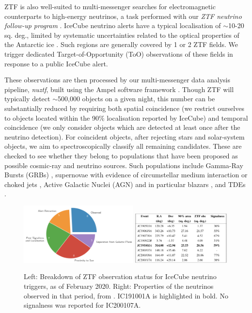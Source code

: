\documentclass[a4paper,11pt]{article}
\begin{document}
ZTF is also well-suited to multi-messenger searches for electromagnetic counterparts to high-energy neutrinos, a task performed with our \emph{ZTF neutrino follow-up program} \cite{bran}. IceCube neutrino alerts have a typical localisation of $\sim$10-20 sq. deg., limited by systematic uncertainties related to the optical properties of the Antarctic ice \cite{ic_resimulations_21}. Such regions are generally covered by 1 or 2 ZTF fields. We trigger dedicated Target-of-Opportunity (ToO) observations of these fields in response to a public IceCube alert. 

These observations are then processed by our multi-messenger data analysis pipeline, \emph{nuztf}, built using the Ampel software framework \cite{ampel, bran, nuztf}. Though ZTF will typically detect $\sim$500,000 objects on a given night, this number can be substantially reduced by requiring both spatial coincidence (we restrict ourselves to objects located within the 90\% localisation reported by IceCube) and temporal coincidence (we only consider objects which are detected at least once after the neutrino detection). For coincident objects, after rejecting stars and solar-system objects, we aim to spectroscopically classify all remaining candidates. These are checked to see whether they belong to populations that have been proposed as possible cosmic-ray and neutrino sources. Such populations include Gamma-Ray Bursts (GRBs) \cite{waxman_bahcall_97_grb}, supernovae with evidence of circumstellar medium interaction \cite{murase_csm_sn_11} or choked jets \cite{senno_choked_jets_16}, Active Galactic Nuclei (AGN) \cite{stecker_91} and in particular blazars \cite{mannheim_93}, and TDEs \cite{farrar_09, farrar_14, dai_17, senno_17, Biehl_tde_uhecr, guepin_18, hayasaki_19, winter_bran_21, winter_icrc_21, murase_tde_20, liu21_bran}.

\begin{figure}[!ht]
	\centering 
	\includegraphics[width=0.53\textwidth]{figures/ztf_pie}
	\includegraphics[width=0.45\textwidth]{figures/ztf_nu_table}
	\caption{Left: Breakdown of ZTF observation status for IceCube neutrino triggers, as of February 2020. Right: Properties of the neutrinos observed in that period, from \cite{bran}. IC191001A is highlighted in bold. No signalness was reported for IC200107A. }
	\label{fig:ztf_stats_bran}
\end{figure}
\end{document}
